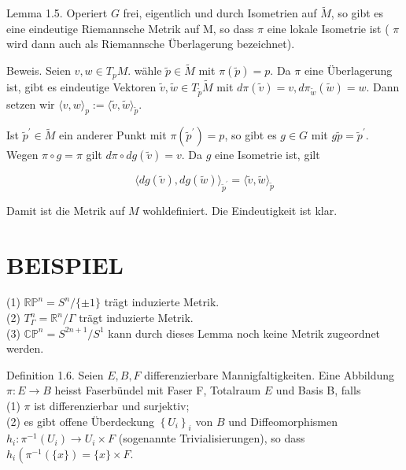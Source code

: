 \documentclass[10pt, letterpaper]{article}
\begin{document}
Lemma 1.5. Operiert $G$ frei, eigentlich und durch Isometrien auf $\tilde{M}$, so gibt es eine eindeutige Riemannsche Metrik auf M, so dass $\pi$ eine lokale Isometrie ist ( $\pi$ wird dann auch als Riemannsche Überlagerung bezeichnet).

Beweis. Seien $v, w \in T_{p} M$. wähle $\tilde{p} \in \tilde{M}$ mit $\pi(\tilde{p})=p$. Da $\pi$ eine Überlagerung ist, gibt es eindeutige Vektoren $\tilde{v}, \tilde{w} \in T_{\tilde{p}} \tilde{M}$ mit $d \pi(\tilde{v})=v, d \pi_{\tilde{w}}(\tilde{w})=w$. Dann setzen wir $\langle v, w\rangle_{p}:=\langle\tilde{v}, \tilde{w}\rangle_{\tilde{p}}$.

Ist $\tilde{p}^{\prime} \in \tilde{M}$ ein anderer Punkt mit $\pi\left(\tilde{p}^{\prime}\right)=p$, so gibt es $g \in G$ mit $g \tilde{p}=\tilde{p}^{\prime}$. Wegen $\pi \circ g=\pi$ gilt $d \pi \circ d g(\tilde{v})=v$. Da $g$ eine Isometrie ist, gilt

$$
\langle d g(\tilde{v}), d g(\tilde{w})\rangle_{\tilde{p}^{\prime}}=\langle\tilde{v}, \tilde{w}\rangle_{\tilde{p}}
$$

Damit ist die Metrik auf $M$ wohldefiniert. Die Eindeutigkeit ist klar.

\section*{BEISPIEL}
(1) $\mathbb{R} \mathbb{P}^{n}=S^{n} /\{ \pm 1\}$ trägt induzierte Metrik.\\
(2) $T_{\Gamma}^{n}=\mathbb{R}^{n} / \Gamma$ trägt induzierte Metrik.\\
(3) $\mathbb{C P}^{n}=S^{2 n+1} / S^{1}$ kann durch dieses Lemma noch keine Metrik zugeordnet werden.

Definition 1.6. Seien $E, B, F$ differenzierbare Mannigfaltigkeiten. Eine Abbildung $\pi: E \rightarrow B$ heisst Faserbündel mit Faser F, Totalraum $E$ und Basis B, falls\\
(1) $\pi$ ist differenzierbar und surjektiv;\\
(2) es gibt offene Überdeckung $\left\{U_{i}\right\}_{i}$ von $B$ und Diffeomorphismen $h_{i}: \pi^{-1}\left(U_{i}\right) \rightarrow U_{i} \times F$ (sogenannte Trivialisierungen), so dass $h_{i}\left(\pi^{-1}(\{x\})=\{x\} \times F\right.$.
\end{document}

